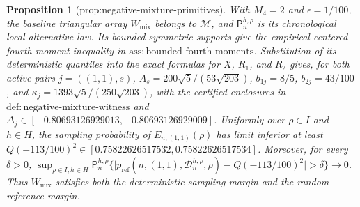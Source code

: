 \documentclass{article}
\newtheorem{proposition}{Proposition}
\begin{document}
\begin{proposition}[prop:negative-mixture-primitives]\label{prop:negative-mixture-primitives}
With \(M_4=2\) and \(\epsilon=1/100\), the baseline triangular array \(W_{\mathrm{mix}}\) belongs to \(\mathcal M\), and \(\mathsf P_n^{h,\rho}\) is its chronological local-alternative law. Its bounded symmetric supports give the empirical centered fourth-moment inequality in \(\mathrm{ass{:}bounded\mbox{-}fourth\mbox{-}moments}\). Substitution of its deterministic quantiles into the exact formulas for \(X\), \(R_1\), and \(R_2\) gives, for both active pairs \(j=((1,1),s)\), \(A_s=200\sqrt5/(53\sqrt{203})\), \(b_{1j}=8/5\), \(b_{2j}=43/100\), and \(\kappa_j=1393\sqrt5/(250\sqrt{203})\), with the certified enclosures in \(\mathrm{def{:}negative\mbox{-}mixture\mbox{-}witness}\) and \(\Delta_j\in[-0.80693126929013,-0.80693126929009]\). Uniformly over \(\rho\in I\) and \(h\in H\), the sampling probability of \(E_{n,(1,1)}(\rho)\) has limit inferior at least \(Q(-113/100)^2\in[0.75822626517532,0.75822626517534]\). Moreover, for every \(\delta>0\), \(\sup_{\rho\in I,h\in H}\mathsf P_n^{h,\rho}\{\lvert p_{\mathrm{ref}}(n,(1,1),\mathcal D_n^{h,\rho},\rho)-Q(-113/100)^2\rvert>\delta\}\to0\). Thus \(W_{\mathrm{mix}}\) satisfies both the deterministic sampling margin and the random-reference margin.
\end{proposition}
\end{document}
